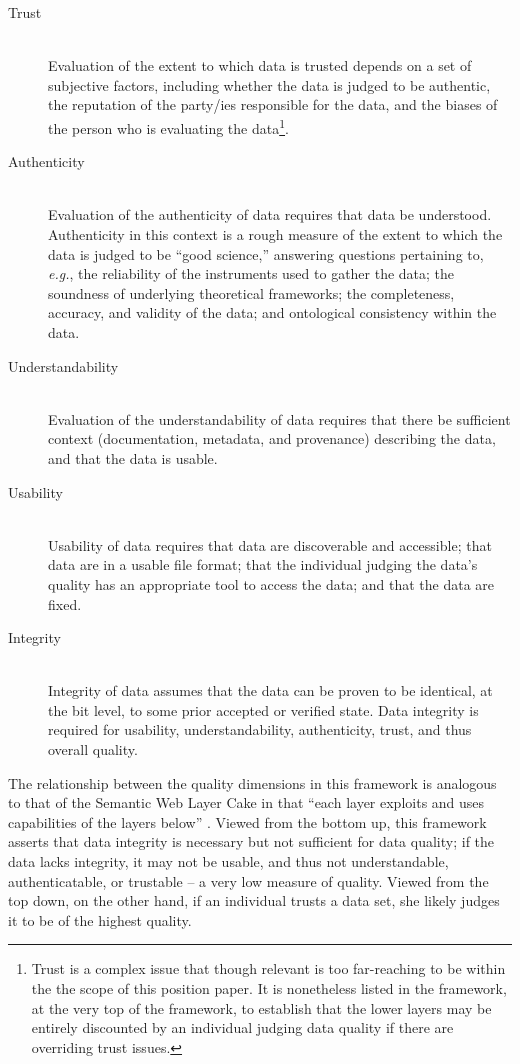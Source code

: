 \documentclass{acm_proc_article-sp}
\begin{document}
\begin{description}
\item[Trust] \hfill \\
  Evaluation of the extent to which data is trusted depends on a set
  of subjective factors, including whether the data is judged to be
  authentic, the reputation of the party/ies responsible for the data,
  and the biases of the person who is evaluating the
  data\footnote{Trust is a complex issue that though relevant is too
    far-reaching to be within the the scope of this position paper. It
    is nonetheless listed in the framework, at the very top of the
    framework, to establish that the lower layers may be entirely
    discounted by an individual judging data quality if there are
    overriding trust issues.}.
\item[Authenticity] \hfill \\
  Evaluation of the authenticity of data requires that data be
  understood. Authenticity in this context is a rough measure of the
  extent to which the data is judged to be ``good science,'' answering
  questions pertaining to, \textit{e.g.}, the reliability of the
  instruments used to gather the data; the soundness of underlying
  theoretical frameworks; the completeness, accuracy, and validity of
  the data; and ontological consistency within the data.
\item[Understandability] \hfill \\
  Evaluation of the understandability of data requires that there be
  sufficient context (documentation, metadata, and provenance)
  describing the data, and that the data is usable.
\item[Usability] \hfill \\
  Usability of data requires that data are discoverable and
  accessible; that data are in a usable file format; that the
  individual judging the data's quality has an appropriate tool to
  access the data; and that the data are fixed.
\item[Integrity] \hfill \\
  Integrity of data assumes that the data can be proven to be
  identical, at the bit level, to some prior accepted or verified
  state. Data integrity is required for usability, understandability,
  authenticity, trust, and thus overall quality.
\end{description}

The relationship between the quality dimensions in this framework is
analogous to that of the Semantic Web Layer Cake in that ``each layer
exploits and uses capabilities of the layers below''
\cite{wiki:semweb}. Viewed from the bottom up, this framework asserts
that data integrity is necessary but not sufficient for data quality;
if the data lacks integrity, it may not be usable, and thus not
understandable, authenticatable, or trustable -- a very low measure of
quality. Viewed from the top down, on the other hand, if an individual
trusts a data set, she likely judges it to be of the highest
quality.
\end{document}
